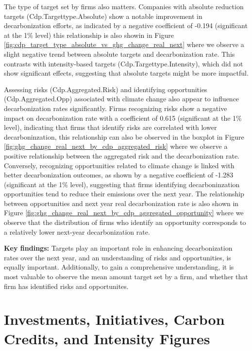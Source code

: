 The type of target set by firms also matters. Companies with absolute reduction targets (Cdp.Targettype.Absolute) show a notable improvement in decarbonization efforts, as indicated by a negative coefficient of -0.194 (significant at the 1\% level) this relationship is also showin in Figure \ref{fig:cdp_target_type_absolute_vs_ghg_change_real_next} where we observe a slight negative trend between absolute targets and decarbonization rate. This contrasts with intensity-based targets (Cdp.Targettype.Intensity), which did not show significant effects, suggesting that absolute targets might be more impactful.


Assessing risks (Cdp.Aggregated.Risk) and identifying opportunities (Cdp.Aggregated.Opp) associated with climate change also appear to influence decarbonization rates significantly. Firms recognizing risks show a negative impact on decarbonization rate with a coefficient of 0.615 (significant at the 1\% level), indicating that firms that identify risks are correlated with lower decarboninzation, this relationship can also be observed in the boxplot in Figure \ref{fig:ghg_change_real_next_by_cdp_aggregated_risk} where we observe a positive relationship between the aggregated risk and the decarbonization rate. Conversely, recognizing opportunities related to climate change is linked with better decarbonization outcomes, as shown by a negative coefficient of -1.283 (significant at the 1\% level), suggesting that firms identifying decarboninzation opportunities tend to reduce their emissions over the next year. The relationship between opportunities and next year real decarbonization rate is also shown in Figure \ref{fig:ghg_change_real_next_by_cdp_aggregated_opportunity} where we observe that the distribution of firms who identify an opportunity corresponds to a relatively lower next-year decarbonization rate.


\textbf{Key findings:} Targets play an important role in enhancing decarbonization rates over the next year, and an understanding of risks and opportunities, is equally important. Additionally, to gain a comprehensive understanding, it is most valuable to observe the mean amount target set by a firm, and whether that firm has identified risks and opportunites.


\section{Investments, Initiatives, Carbon Credits, and Intensity Figures}

